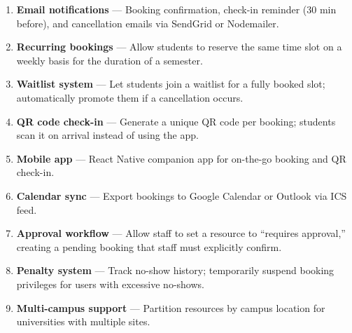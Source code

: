 \documentclass[12pt]{article}
\begin{document}
\begin{enumerate}
    \item \textbf{Email notifications} --- Booking confirmation, check-in reminder (30 min before), and cancellation emails via SendGrid or Nodemailer.
    \item \textbf{Recurring bookings} --- Allow students to reserve the same time slot on a weekly basis for the duration of a semester.
    \item \textbf{Waitlist system} --- Let students join a waitlist for a fully booked slot; automatically promote them if a cancellation occurs.
    \item \textbf{QR code check-in} --- Generate a unique QR code per booking; students scan it on arrival instead of using the app.
    \item \textbf{Mobile app} --- React Native companion app for on-the-go booking and QR check-in.
    \item \textbf{Calendar sync} --- Export bookings to Google Calendar or Outlook via ICS feed.
    \item \textbf{Approval workflow} --- Allow staff to set a resource to ``requires approval,'' creating a pending booking that staff must explicitly confirm.
    \item \textbf{Penalty system} --- Track no-show history; temporarily suspend booking privileges for users with excessive no-shows.
    \item \textbf{Multi-campus support} --- Partition resources by campus location for universities with multiple sites.
\end{enumerate}
\end{document}
